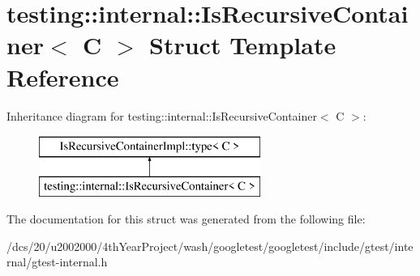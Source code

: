 \hypertarget{structtesting_1_1internal_1_1IsRecursiveContainer}{}\section{testing\+:\+:internal\+:\+:Is\+Recursive\+Container$<$ C $>$ Struct Template Reference}
\label{structtesting_1_1internal_1_1IsRecursiveContainer}
Inheritance diagram for testing\+:\+:internal\+:\+:Is\+Recursive\+Container$<$ C $>$\+:\begin{figure}[H]
\begin{center}
\leavevmode
\includegraphics[height=2.000000cm]{structtesting_1_1internal_1_1IsRecursiveContainer}
\end{center}
\end{figure}


The documentation for this struct was generated from the following file\+:\begin{DoxyCompactItemize}
\item 
/dcs/20/u2002000/4th\+Year\+Project/wash/googletest/googletest/include/gtest/internal/gtest-\/internal.\+h\end{DoxyCompactItemize}
